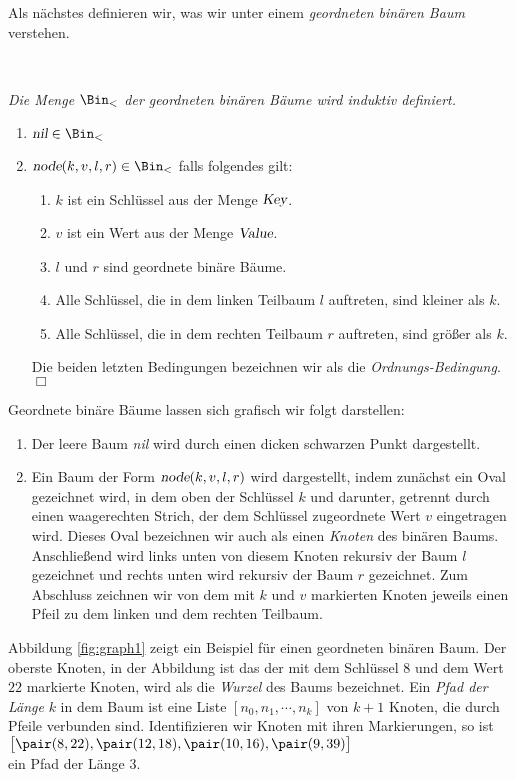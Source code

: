 \noindent
Als n\"achstes definieren wir, was wir unter einem \emph{geordneten bin\"aren Baum} verstehen.
\begin{Definition} \hspace*{\fill} \\
{\em
  Die Menge $\Bin_<$ der \emph{geordneten bin\"aren B\"aume} wird induktiv definiert.
  \begin{enumerate}
  \item $\textsl{nil} \in \Bin_<$
  \item $\textsl{node}(k, v, l, r) \in \Bin_<$ \quad falls folgendes gilt:
        \begin{enumerate}
        \item $k$ ist ein Schl\"ussel aus der Menge $\textsl{Key}$.
        \item $v$ ist ein Wert aus der Menge $\textsl{Value}$.
        \item $l$ und $r$ sind geordnete bin\"are B\"aume.
        \item Alle Schl\"ussel, die in dem linken Teilbaum $l$ auftreten,
              sind kleiner als $k$.
        \item Alle Schl\"ussel, die in dem rechten Teilbaum $r$ auftreten,
              sind gr\"o{\ss}er als $k$.
        \end{enumerate}
        Die beiden letzten  Bedingungen bezeichnen wir als die \emph{Ordnungs-Bedingung}.
        \hspace*{\fill} $\Box$
  \end{enumerate}
}  
\end{Definition}
Geordnete bin\"are B\"aume lassen sich grafisch wir folgt darstellen:
\begin{enumerate}
\item Der leere Baum \textsl{nil} wird durch einen dicken schwarzen Punkt dargestellt.
\item Ein Baum der Form $\textsl{node}(k,v,l,r)$ wird dargestellt,  indem zun\"achst ein
      Oval gezeichnet wird, in dem oben der Schl\"ussel $k$ und darunter, getrennt durch
      einen waagerechten Strich, der dem Schl\"ussel zugeordnete Wert $v$ eingetragen wird.
      Dieses Oval bezeichnen wir auch als einen \emph{Knoten} des bin\"aren Baums.
      Anschlie{\ss}end wird links unten von diesem Knoten rekursiv der Baum $l$ gezeichnet
      und  rechts unten wird rekursiv der Baum $r$ gezeichnet. Zum Abschluss zeichnen wir
      von dem mit $k$ und $v$ markierten Knoten jeweils einen Pfeil zu dem linken und dem
      rechten Teilbaum.
\end{enumerate}
Abbildung \ref{fig:graph1} zeigt ein Beispiel f\"ur einen
geordneten bin\"aren Baum.  Der oberste Knoten, in der Abbildung ist das der mit dem Schl\"ussel
$8$ und dem Wert $22$ markierte Knoten, wird als die \emph{Wurzel} des Baums bezeichnet.
Ein \emph{Pfad der L\"ange} $k$ in dem Baum ist eine Liste $[n_0,n_1, \cdots, n_k]$ von
$k+1$ Knoten, die durch Pfeile verbunden sind. Identifizieren wir Knoten mit ihren
Markierungen, so ist \\[0.1cm]
\hspace*{1.3cm} $\bigl[ \pair(8,22), \pair(12,18), \pair(10,16), \pair(9,39) \bigr]$ \\[0.1cm]
ein Pfad der L\"ange 3.


